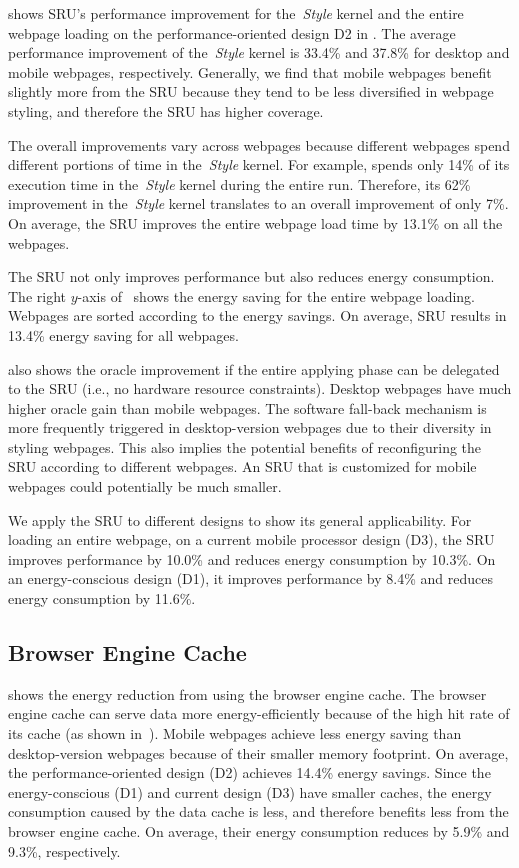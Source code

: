  shows SRU's performance improvement for the~\textit{Style} kernel and the entire webpage loading on the performance-oriented design D2 in .  The average performance improvement of the~\textit{Style} kernel is 33.4\% and 37.8\% for desktop and mobile webpages, respectively. Generally, we find that mobile webpages benefit slightly more from the SRU because they tend to be less diversified in webpage styling, and therefore the SRU has higher coverage.

The overall improvements vary across webpages because different webpages spend different portions of time in the~\textit{Style} kernel. For example,  spends only 14\% of its execution time in the~\textit{Style} kernel during the entire run. Therefore, its 62\% improvement in the~\textit{Style} kernel translates to an overall improvement of only 7\%. On average, the SRU improves the entire webpage load time by 13.1\% on all the webpages.

The SRU not only improves performance but also reduces energy consumption. The right $y$-axis of~ shows the energy saving for the entire webpage loading. Webpages are sorted according to the energy savings. On average, SRU results in 13.4\% energy saving for all webpages.

 also shows the oracle improvement if the entire applying phase can be delegated to the SRU (i.e., no hardware resource constraints). Desktop webpages have much higher oracle gain than mobile webpages. The software fall-back mechanism is more frequently triggered in desktop-version webpages due to their diversity in styling webpages. This also implies the potential benefits of reconfiguring the SRU according to different webpages. An SRU that is customized for mobile webpages could potentially be much smaller.

We apply the SRU to different designs to show its general applicability. For loading an entire webpage, on a current mobile processor design (D3), the SRU improves performance by 10.0\% and reduces energy consumption by 10.3\%. On an energy-conscious design (D1), it improves performance by 8.4\% and reduces energy consumption by 11.6\%.

\subsection{Browser Engine Cache}
\label{sec:arch:eval:cache}

 shows the energy reduction from using the browser engine cache. The browser engine cache can serve data more energy-efficiently because of the high hit rate of its cache (as shown in~). Mobile webpages achieve less energy saving than desktop-version webpages because of their smaller memory footprint. On average, the performance-oriented design (D2) achieves 14.4\% energy savings. Since the energy-conscious (D1) and current design (D3) have smaller caches, the energy consumption caused by the data cache is less, and therefore benefits less from the browser engine cache. On average, their energy consumption reduces by 5.9\% and 9.3\%, respectively.

